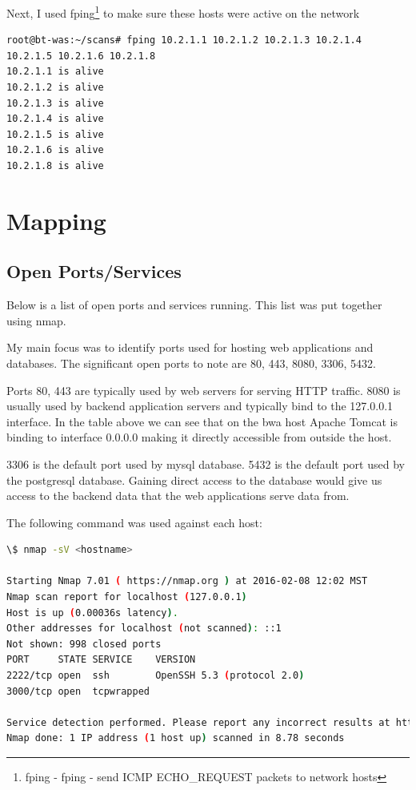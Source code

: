 \documentclass{article}
\begin{document}
Next, I used fping\footnote{\label{fping}fping - fping - send ICMP ECHO\_REQUEST packets to network hosts} 
to make sure these hosts were active on the network

\begin{lstlisting}
root@bt-was:~/scans# fping 10.2.1.1 10.2.1.2 10.2.1.3 10.2.1.4 10.2.1.5 10.2.1.6 10.2.1.8
10.2.1.1 is alive
10.2.1.2 is alive
10.2.1.3 is alive
10.2.1.4 is alive
10.2.1.5 is alive
10.2.1.6 is alive
10.2.1.8 is alive
\end{lstlisting}


\newpage
\section{Mapping}
\subsection{Open Ports/Services}

Below is a list of open ports and services running. This list was put together using nmap.


My main focus was to identify ports used for hosting web applications and databases. 
The significant open ports to note are 80, 443, 8080, 3306, 5432.

Ports 80, 443 are typically used by web servers for serving HTTP traffic.
8080 is usually used by backend application servers and typically bind to the 127.0.0.1
interface. In the table above we can see that on the bwa host Apache Tomcat is binding 
to interface 0.0.0.0 making it directly accessible from outside the host.

3306 is the default port used by mysql database.
5432 is the default port used by the postgresql database.
Gaining direct access to the database would give us access to the backend data
that the web applications serve data from.

\noindent The following command was used against each host:
\begin{lstlisting}[language=bash, firstline=1, lastline=3]
\$ nmap -sV <hostname>

Starting Nmap 7.01 ( https://nmap.org ) at 2016-02-08 12:02 MST
Nmap scan report for localhost (127.0.0.1)
Host is up (0.00036s latency).
Other addresses for localhost (not scanned): ::1
Not shown: 998 closed ports
PORT     STATE SERVICE    VERSION
2222/tcp open  ssh        OpenSSH 5.3 (protocol 2.0)
3000/tcp open  tcpwrapped

Service detection performed. Please report any incorrect results at https://nmap.org/submit/ .
Nmap done: 1 IP address (1 host up) scanned in 8.78 seconds
\end{lstlisting}
\end{document}
